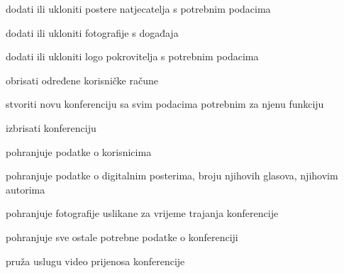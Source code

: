 \begin{packed_enum}
\begin{packed_enum}
				\end{packed_enum}
				
				\item {}
				
				\begin{packed_enum}
					
					\item dodati ili ukloniti postere natjecatelja s potrebnim podacima
					\item dodati ili ukloniti fotografije s događaja
					\item dodati ili ukloniti logo pokrovitelja s potrebnim podacima
					\item obrisati određene korisničke račune
					
				\end{packed_enum}
				
				\item {}
				
				\begin{packed_enum}
					
					\item stvoriti novu konferenciju sa svim podacima potrebnim za njenu funkciju
					\item izbrisati konferenciju

				\end{packed_enum}
				
				\item {}
				
				\begin{packed_enum}
					
					\item pohranjuje podatke o korisnicima
					\item pohranjuje podatke o digitalnim posterima, broju njihovih glasova, njihovim autorima
					\item pohranjuje fotografije uslikane za vrijeme trajanja konferencije
					\item pohranjuje sve ostale potrebne podatke o konferenciji
					
				\end{packed_enum}
				
				\item {}
				
				\begin{packed_enum}
					
					\item pruža uslugu video prijenosa konferencije
				

\end{packed_enum}
\end{packed_enum}
